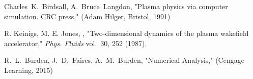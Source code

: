 \documentclass[twocolumn,showpacs,aip]{revtex4}
\begin{document}
\begin{thebibliography}{10}
Charles~K.~Birdsall, A.~Bruce~Langdon, "Plasma physics via computer simulation. CRC press," (Adam Hilger, Bristol, 1991)



    R. Keinigs, M. E. Jones, , "Two-dimensional dynamics of the plasma wakefield accelerator," 
    {\em Phys. Fluids} vol.~30, 252 (1987).


 	R.~L.~Burden, J.~D.~Faires, A.~M.~Burden, "Numerical Analysis,"
    (Cengage Learning, 2015)			

\end{thebibliography}

 
\end{document}
